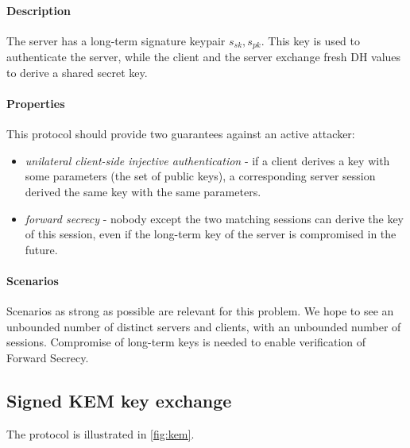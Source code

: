 \documentclass[11pt]{article}
\newcommand{\sfsk}{\mathit{sk}}
\newcommand{\sfpk}{\mathit{pk}}
\begin{document}
 \paragraph{Description} The server has a long-term signature keypair $s_\sfsk,s_\sfpk$.
This key is used to authenticate the server, while the client and the server exchange fresh DH values to derive a shared secret key.

\paragraph{Properties} This protocol should provide two guarantees against an active attacker:
\begin{itemize}
\item \emph{unilateral client-side injective authentication} - if a client derives a key with some parameters (the set of public keys), a corresponding server session derived the same key with the same parameters.
\item \emph{forward secrecy} - nobody except the two matching sessions can derive the key of this session, even if the long-term key of the server is compromised in the future.
\end{itemize}

\paragraph{Scenarios} Scenarios as strong as possible are relevant for this problem. We hope to see an unbounded number of distinct servers and clients, with an unbounded number of sessions. Compromise of long-term keys is needed to enable verification of Forward Secrecy.  


\subsection{Signed KEM key exchange}\label{prob:kem}

The protocol is illustrated in \cref{fig:kem}.
\end{document}

